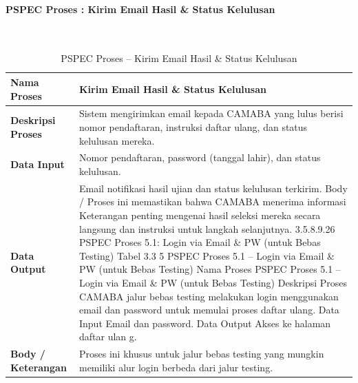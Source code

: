 \paragraph{PSPEC Proses : Kirim Email Hasil \& Status Kelulusan}~\\
\begin{longtable}{|p{}|p{}|}
	\caption{PSPEC Proses  -- Kirim Email Hasil \& Status Kelulusan}
	\label{table:3.pspec}\\
	\hline
	\textbf{Nama Proses} & Kirim Email Hasil \& Status Kelulusan \\
	\hline
	\textbf{Deskripsi Proses} & Sistem mengirimkan email kepada CAMABA yang lulus berisi nomor pendaftaran, instruksi daftar ulang, dan status kelulusan mereka. \\
	\hline
	\textbf{Data Input} & Nomor pendaftaran, password (tanggal lahir), dan status kelulusan. \\
	\hline
	\textbf{Data Output} & Email notifikasi hasil ujian dan status kelulusan terkirim. Body / Proses ini memastikan bahwa CAMABA menerima informasi Keterangan penting mengenai hasil seleksi mereka secara langsung dan instruksi untuk langkah selanjutnya. 3.5.8.9.26 PSPEC Proses 5.1: Login via Email \& PW (untuk Bebas Testing) Tabel 3.3 5 PSPEC Proses 5.1 – Login via Email \& PW (untuk Bebas Testing) Nama Proses PSPEC Proses 5.1 – Login via Email \& PW (untuk Bebas Testing) Deskripsi Proses CAMABA jalur bebas testing melakukan login menggunakan email dan password untuk memulai proses daftar ulang. Data Input Email dan password. Data Output Akses ke halaman daftar ulan g. \\
	\hline
	\textbf{Body / Keterangan} & Proses ini khusus untuk jalur bebas testing yang mungkin memiliki alur login berbeda dari jalur testing. \\
	\hline
\end{longtable}


